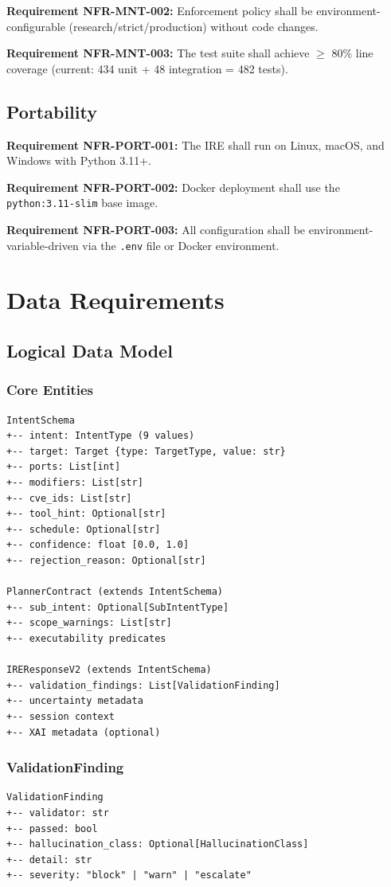 ﻿\documentclass[10pt,journal,onecolumn]{IEEEtran}
\newcommand{\reqid}[1]{\textbf{#1}}
\begin{document}
\reqid{Requirement NFR-MNT-002:} Enforcement policy shall be environment-configurable (research/strict/production) without code changes.

\reqid{Requirement NFR-MNT-003:} The test suite shall achieve $\geq$ 80\% line coverage (current: 434 unit + 48 integration = 482 tests).

\subsection{Portability}
\reqid{Requirement NFR-PORT-001:} The IRE shall run on Linux, macOS, and Windows with Python 3.11+.

\reqid{Requirement NFR-PORT-002:} Docker deployment shall use the \texttt{python:3.11-slim} base image.

\reqid{Requirement NFR-PORT-003:} All configuration shall be environment-variable-driven via the \texttt{.env} file or Docker environment.
\section{Data Requirements}

\subsection{Logical Data Model}

\subsubsection{Core Entities}
\begin{lstlisting}
IntentSchema
+-- intent: IntentType (9 values)
+-- target: Target {type: TargetType, value: str}
+-- ports: List[int]
+-- modifiers: List[str]
+-- cve_ids: List[str]
+-- tool_hint: Optional[str]
+-- schedule: Optional[str]
+-- confidence: float [0.0, 1.0]
+-- rejection_reason: Optional[str]

PlannerContract (extends IntentSchema)
+-- sub_intent: Optional[SubIntentType]
+-- scope_warnings: List[str]
+-- executability predicates

IREResponseV2 (extends IntentSchema)
+-- validation_findings: List[ValidationFinding]
+-- uncertainty metadata
+-- session context
+-- XAI metadata (optional)
\end{lstlisting}

\subsubsection{ValidationFinding}
\begin{lstlisting}
ValidationFinding
+-- validator: str
+-- passed: bool
+-- hallucination_class: Optional[HallucinationClass]
+-- detail: str
+-- severity: "block" | "warn" | "escalate"
\end{lstlisting}
\end{document}
